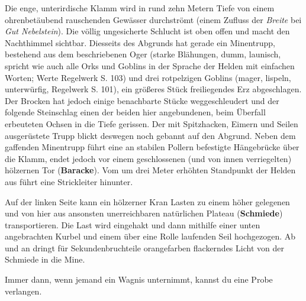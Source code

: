 Die enge, unterirdische Klamm wird in rund zehn Metern Tiefe von einem ohrenbetäubend rauschenden Gewässer durchströmt (einem Zufluss der \textit{Breite} bei \textit{Gut Nebelstein}). Die völlig ungesicherte Schlucht ist oben offen und macht den Nachthimmel sichtbar.
Diesseits des Abgrunds hat gerade ein Minentrupp, bestehend aus dem beschriebenen Oger (starke Blähungen, dumm, launisch, spricht wie auch alle Orks und Goblins in der Sprache der Helden mit einfachen Worten; Werte Regelwerk S. 103) und drei rotpelzigen Goblins (mager, lispeln, unterwürfig, Regelwerk S. 101), ein größeres Stück freiliegendes Erz abgeschlagen.
Der Brocken hat jedoch einige benachbarte Stücke weggeschleudert und der folgende Steinschlag einen der beiden hier angebundenen, beim Überfall erbeuteten Ochsen in die Tiefe gerissen.
Der mit Spitzhacken, Eimern und Seilen ausgerüstete Trupp blickt deswegen noch gebannt auf den Abgrund.
Neben dem gaffenden Minentrupp führt eine an stabilen Pollern befestigte Hängebrücke über die Klamm, endet jedoch vor einem geschlossenen (und von innen verriegelten) hölzernen Tor (\textbf{Baracke}). Vom um drei Meter erhöhten Standpunkt der Helden aus führt eine Strickleiter hinunter.

Auf der linken Seite kann ein hölzerner Kran Lasten zu einem höher gelegenen und von hier aus ansonsten unerreichbaren natürlichen Plateau (\textbf{Schmiede}) transportieren.
Die Last wird eingehakt und dann mithilfe einer unten angebrachten Kurbel und einem über eine Rolle laufenden Seil hochgezogen.
Ab und an dringt für Sekundenbruchteile orangefarben flackerndes Licht von der Schmiede in die Mine.

Immer dann, wenn jemand ein Wagnis unternimmt, kannst du eine Probe verlangen.



